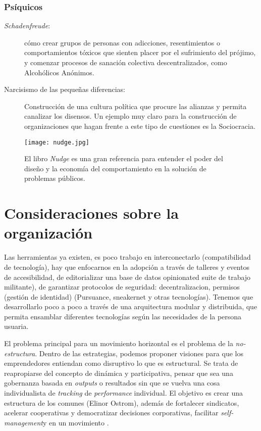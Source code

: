 \subsubsection{Psíquicos}
\label{subs:psiquicos}

\begin{description}
	\item[\emph{Schadenfreude}:] cómo crear grupos de personas con adicciones, resentimientos o comportamientos tóxicos que sienten placer por el sufrimiento del prójimo, y comenzar procesos de sanación colectiva descentralizados, como Alcohólicos Anónimos.

	\item[Narcisismo de las pequeñas diferencias:] Construcción de una cultura política que procure las alianzas y permita canalizar los disensos. Un ejemplo muy claro para la construcción de organizaciones que hagan frente a este tipo de cuestiones es la Sociocracia.
\end{description}

\begin{figure}[htbp]
	\centering
	\texttt{[image: nudge.jpg]}
	\caption[\emph{Nudge}]{El libro \emph{Nudge} es una gran referencia para entender el poder del diseño y la economía del comportamiento en la solución de problemas públicos.}
	\label{fig:nudge}
\end{figure}

\section{Consideraciones sobre la organización}
\label{sec:considerorga}

Las herramientas ya existen, es poco trabajo en interconectarlo (compatibilidad de tecnología), hay que enfocarnos en la adopción a través de talleres y eventos de accesibilidad, de editorializar una base de datos opinionated suite de trabajo militante), de garantizar protocolos de seguridad: decentralizacion, permisos (gestión de identidad) (Pursuance, sneakernet y otras tecnologías). Tenemos que desarrollarlo poco a poco a través de una arquitectura modular y distribuida, que permita ensamblar diferentes tecnologías según las necesidades de la persona usuaria.

El problema principal para un movimiento horizontal es el problema de la \emph{no-estructura}. Dentro de las estrategias, podemos proponer visiones para que los emprendedores entiendan como disruptivo lo que es estructural. Se trata de reapropiarse del concepto de  dinámica y participativa, pensar que sea una gobernanza basada en \emph{outputs} o resultados sin que se vuelva una cosa individualista de \emph{tracking} de \emph{performance} individual. El objetivo es crear una estructura de los comunes (Elinor Ostrom), además de fortalecer sindicatos, acelerar cooperativas y democratizar decisiones corporativas, facilitar \emph{self-management}y  en un movimiento .

